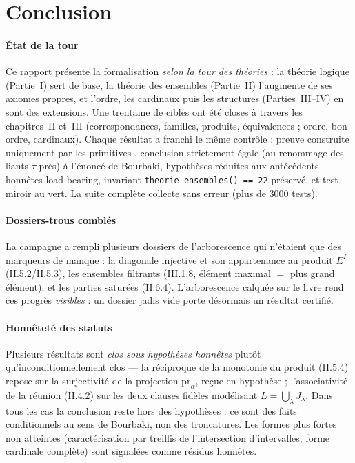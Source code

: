 \section*{Conclusion}

\paragraph{État de la tour} Ce rapport présente la formalisation \emph{selon la
tour des théories} : la théorie logique (Partie~I) sert de base, la théorie des
ensembles (Partie~II) l'augmente de ses axiomes propres, et l'ordre, les
cardinaux puis les structures (Parties~III--IV) en sont des extensions. Une
trentaine de cibles ont été closes à travers les chapitres~II et~III
(correspondances, familles, produits, équivalences ; ordre, bon ordre,
cardinaux). Chaque résultat a franchi le même contrôle : preuve construite uniquement par les primitives
\Nstar{}, conclusion strictement égale (au renommage des liants $\tau$ près) à
l'énoncé de Bourbaki, hypothèses réduites aux antécédents honnêtes load-bearing,
invariant \texttt{theorie\_ensembles() == 22} préservé, et test miroir au vert.
La suite complète collecte sans erreur (plus de $3000$ tests).

\paragraph{Dossiers-trous comblés} La campagne a rempli plusieurs dossiers de
l'arborescence qui n'étaient que des marqueurs de manque : la diagonale
injective et son appartenance au produit $E^I$ (II.5.2/II.5.3), les ensembles
filtrants (III.1.8, élément maximal $=$ plus grand élément), et les parties
saturées (II.6.4). L'arborescence calquée sur le livre rend ces progrès
\emph{visibles} : un dossier jadis vide porte désormais un résultat certifié.

\paragraph{Honnêteté des statuts} Plusieurs résultats sont \emph{clos sous
hypothèses honnêtes} plutôt qu'inconditionnellement clos --- la réciproque de la
monotonie du produit (II.5.4) repose sur la surjectivité de la projection
$\mathrm{pr}_\alpha$, reçue en hypothèse ; l'associativité de la réunion (II.4.2)
sur les deux clauses fidèles modélisant $L = \bigcup_\lambda J_\lambda$. Dans
tous les cas la conclusion reste hors des hypothèses : ce sont des faits
conditionnels au sens de Bourbaki, non des troncatures. Les formes plus fortes
non atteintes (caractérisation par treillis de l'intersection d'intervalles,
forme cardinale complète) sont signalées comme résidus honnêtes.

